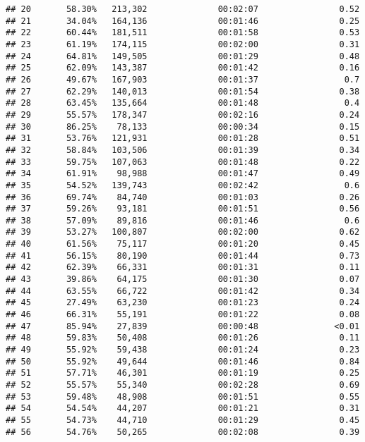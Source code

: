 \documentclass[
]{article}
\begin{document}
\begin{verbatim}
## 20       58.30%   213,302              00:02:07                0.52
## 21       34.04%   164,136              00:01:46                0.25
## 22       60.44%   181,511              00:01:58                0.53
## 23       61.19%   174,115              00:02:00                0.31
## 24       64.81%   149,505              00:01:29                0.48
## 25       62.09%   143,387              00:01:42                0.16
## 26       49.67%   167,903              00:01:37                 0.7
## 27       62.29%   140,013              00:01:54                0.38
## 28       63.45%   135,664              00:01:48                 0.4
## 29       55.57%   178,347              00:02:16                0.24
## 30       86.25%    78,133              00:00:34                0.15
## 31       53.76%   121,931              00:01:28                0.51
## 32       58.84%   103,506              00:01:39                0.34
## 33       59.75%   107,063              00:01:48                0.22
## 34       61.91%    98,988              00:01:47                0.49
## 35       54.52%   139,743              00:02:42                 0.6
## 36       69.74%    84,740              00:01:03                0.26
## 37       59.26%    93,181              00:01:51                0.56
## 38       57.09%    89,816              00:01:46                 0.6
## 39       53.27%   100,807              00:02:00                0.62
## 40       61.56%    75,117              00:01:20                0.45
## 41       56.15%    80,190              00:01:44                0.73
## 42       62.39%    66,331              00:01:31                0.11
## 43       39.86%    64,175              00:01:30                0.07
## 44       63.55%    66,722              00:01:42                0.34
## 45       27.49%    63,230              00:01:23                0.24
## 46       66.31%    55,191              00:01:22                0.08
## 47       85.94%    27,839              00:00:48               <0.01
## 48       59.83%    50,408              00:01:26                0.11
## 49       55.92%    59,438              00:01:24                0.23
## 50       55.92%    49,644              00:01:46                0.84
## 51       57.71%    46,301              00:01:19                0.25
## 52       55.57%    55,340              00:02:28                0.69
## 53       59.48%    48,908              00:01:51                0.55
## 54       54.54%    44,207              00:01:21                0.31
## 55       54.73%    44,710              00:01:29                0.45
## 56       54.76%    50,265              00:02:08                0.39

\end{verbatim}
\end{document}
